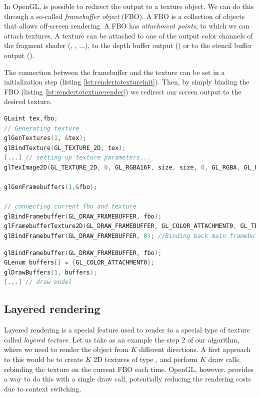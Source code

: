 In OpenGL, is possible to redirect the output to a texture object. We can do this through a so-called \emph{framebuffer object} (FBO). A FBO is a collection of objects that allows off-screen rendering. A FBO has \emph{attachment points}, to which we can attach textures. A texture can be attached to one of the output color channels of the fragment shader (, , ...), to the depth buffer output () or to the stencil buffer output ().

The connection between the framebuffer and the texture can be set in a initialization step (listing \ref{lst:rendertotextureinit}). Then, by simply binding the FBO (listing \ref{lst:rendertotexturerender}) we redirect our screen output to the desired texture.

\begin{lstlisting}[language=C++,label=lst:rendertotextureinit,caption={Render to texture example, initilalization phase. Note the call to \gl{glFramebufferTexture2D}}]
GLuint tex,fbo;
// Generating texture
glGenTextures(1, &tex);
glBindTexture(GL_TEXTURE_2D, tex);
[...] // setting up texture parameters...
glTexImage2D(GL_TEXTURE_2D, 0, GL_RGBA16F, size, size, 0, GL_RGBA, GL_FLOAT, 0);

glGenFramebuffers(1,&fbo);

// connecting current fbo and texture
glBindFramebuffer(GL_DRAW_FRAMEBUFFER, fbo);
glFramebufferTexture2D(GL_DRAW_FRAMEBUFFER, GL_COLOR_ATTACHMENT0, GL_TEXTURE_2D, tex, 0);
glBindFramebuffer(GL_DRAW_FRAMEBUFFER, 0); //Binding back main framebuffer
\end{lstlisting}

\begin{lstlisting}[language=C++,label=lst:rendertotexturerender,caption={Render to texture example, rendering phase. Since we have not configured and FBO for depth and stencil buffers, depth testing and stencil should be disabled at this point.}]
glBindFramebuffer(GL_DRAW_FRAMEBUFFER, fbo);
GLenum buffers[] = {GL_COLOR_ATTACHMENT0};
glDrawBuffers(1, buffers);
[...] // draw model
\end{lstlisting}

\subsection{Layered rendering}
\label{sec:layeredrendering}
Layered rendering is a special feature used to render to a special type of texture called \emph{layered texture}. Let us take as an example the step 2 of our algorithm, where we need to render the object from $K$ different directions. A first approach to this would be to create $K$ 2D textures of type , and perform $K$ draw calls, rebinding the texture on the current FBO each time. OpenGL, however, provides a way to do this with a single draw call, potentially reducing the rendering costs due to context switching.

